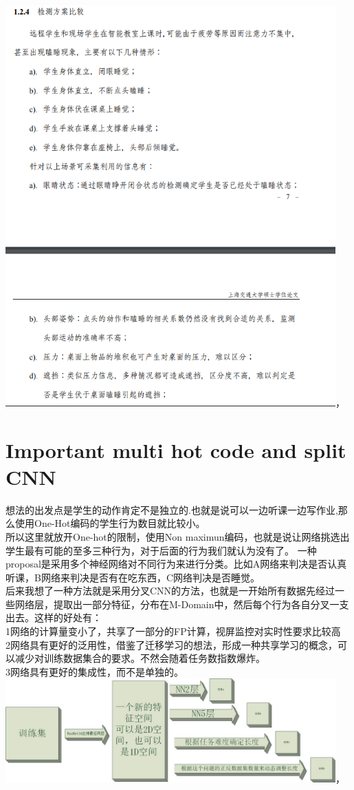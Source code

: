 \documentclass[]{article}
\begin{document}
\begin{CJK}{UTF8}{}
\includegraphics[width=5in]{pic10}，\\
\section{Important multi hot code and split CNN}
想法的出发点是学生的动作肯定不是独立的.也就是说可以一边听课一边写作业,那么使用One-Hot编码的学生行为数目就比较小。\\
所以这里就放开One-hot的限制，使用Non maximun编码，也就是说让网络挑选出学生最有可能的至多三种行为，对于后面的行为我们就认为没有了。
一种proposal是采用多个神经网络对不同行为来进行分类。比如A网络来判决是否认真听课，B网络来判决是否有在吃东西，C网络判决是否睡觉。\\
后来我想了一种方法就是采用分叉CNN的方法，也就是一开始所有数据先经过一些网络层，提取出一部分特征，分布在M-Domain中，然后每个行为各自分叉一支出去。这样的好处有：\\
1网络的计算量变小了，共享了一部分的FP计算，视屏监控对实时性要求比较高\\
2网络具有更好的泛用性，借鉴了迁移学习的想法，形成一种共享学习的概念，可以减少对训练数据集合的要求。不然会随着任务数指数爆炸。\\
3网络具有更好的集成性，而不是单独的。\\
\includegraphics[width=5in]{TreeNN}， 

\end{CJK}
\end{document}
